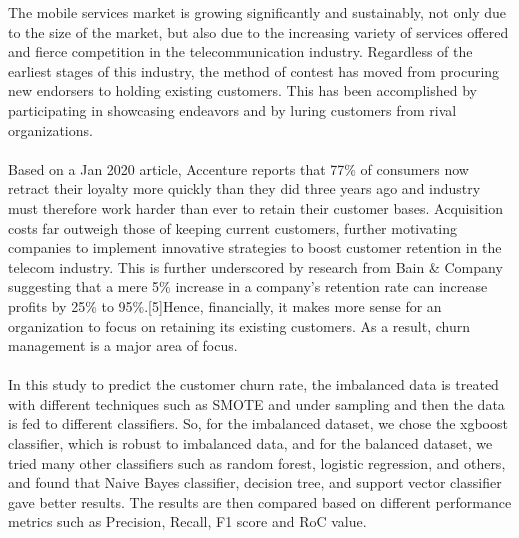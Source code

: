 \documentclass[a4paper, 10pt, conference]{ieeeconf}      %
\begin{document}
The mobile services market is growing significantly and sustainably, not only due to the size of the market, but also due to the increasing variety of services offered and fierce competition in the telecommunication industry. Regardless of the earliest stages of this industry, the method of contest has moved from procuring new endorsers to holding existing customers. This has been accomplished by participating in showcasing endeavors and by luring customers from rival organizations.
\\
\\Based on a Jan 2020 article, Accenture reports that 77\% of consumers now retract their loyalty more quickly than they did three years ago and industry must therefore work harder than ever to retain their customer bases. Acquisition costs far outweigh those of keeping current customers, further motivating companies to implement innovative strategies to boost customer retention in the telecom industry. This is further underscored by research from Bain & Company suggesting that a mere 5\% increase in a company’s retention rate can increase profits by 25\% to 95\%.[5]Hence, financially, it makes more sense for an organization to focus on retaining its existing customers. As a result, churn management is a major area of focus.
\\
\\In this study to predict the customer churn rate, the imbalanced data is treated with different techniques such as SMOTE and under sampling and then the data is fed to different classifiers. So, for the imbalanced dataset, we chose the xgboost classifier, which is robust to imbalanced data, and for the balanced dataset, we tried many other classifiers such as random forest, logistic regression, and others, and found that Naive Bayes classifier, decision tree, and support vector classifier gave better results. The results are then compared based on different  performance metrics such as Precision, Recall, F1 score and RoC value. 
\end{document}
